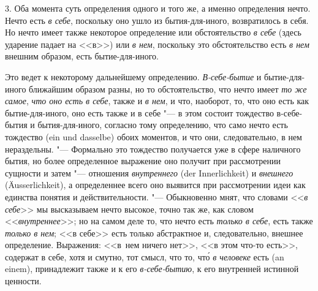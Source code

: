 3. Оба момента суть определения одного и того же, а именно определения
нечто. Нечто есть {\em в себе}, поскольку оно ушло из
бытия-для-иного, возвратилось в себя. Но нечто имеет также некоторое
определение или обстоятельство {\em в себе} (здесь
ударение падает на <<в>>) или {\em в нем}, поскольку это
обстоятельство есть {\em в нем} внешним образом, есть
бытие-для-иного.

Это ведет к некоторому дальнейшему определению.
{\em В-себе-бытие} и бытие-для-иного ближайшим
образом разны, но то обстоятельство, что нечто имеет
{\em то же самое}, {\em что оно
есть в себе}, также и {\em в нем}, и что, наоборот, то,
что оно есть как бытие-для-иного, оно есть также и в себе "--- в этом
состоит тождество в-себе-бытия и бытия-для-иного, согласно тому
определению, что само нечто есть тождество (ein und dasselbe) обоих
моментов, и что они, следовательно, в нем нераздельны. "--- Формально это
тождество получается уже в сфере наличного бытия, но более определенное
выражение оно получит при рассмотрении сущности и затем "--- отношения
{\em внутреннего} (der Innerlichkeit) и
{\em внешнего} (Äusserlichkeit), а определеннее всего
оно выявится при рассмотрении идеи как единства понятия и действительности.
"--- Обыкновенно мнят, что словами <<{\em в себе}>> мы
высказываем нечто высокое, точно так же, как словом
<<{\em внутреннее}>>; но на самом деле то, что нечто есть
{\em только в себе}, есть также {\em только в нем}; <<в себе>> есть только
абстрактное и, следовательно, внешнее определение. Выражения: <<в~нем
ничего нет>>, <<в этом что-то есть>>, содержат в себе, хотя и смутно, тот
смысл, что то, чт\'{о} {\em в человеке} есть (an einem), принадлежит также
и к его {\em в-себе-бытию}, к его внутренней истинной ценности.


